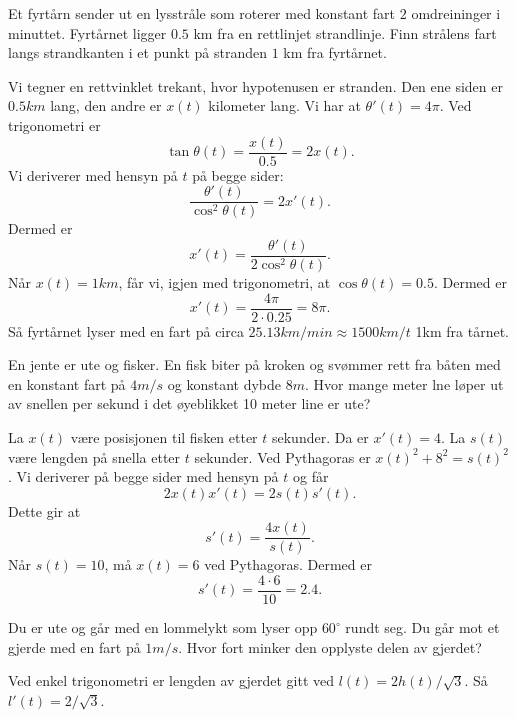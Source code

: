 \documentclass[11pt, norsk]{article}
\begin{document}
\begin{oppg}[7.2.3]
Et fyrtårn sender ut en lysstråle som roterer med konstant fart $2$ omdreininger i minuttet. Fyrtårnet ligger $0.5$ km fra en rettlinjet strandlinje. Finn strålens fart langs strandkanten i et punkt på stranden $1$ km fra fyrtårnet.
\end{oppg}

\begin{losn}
Vi tegner en rettvinklet trekant, hvor hypotenusen er stranden. Den ene siden er $0.5 km$ lang, den andre er $x(t)$ kilometer lang. Vi har at $\theta'(t)=4 \pi$. Ved trigonometri er
$$
\tan \theta(t) = \frac{x(t)}{0.5} = 2x(t).
$$
Vi deriverer med hensyn på $t$ på begge sider:
$$
\frac{\theta'(t)}{\cos^2 \theta(t)} = 2 x'(t).
$$
Dermed er 
$$
x'(t) = \frac{\theta'(t)}{2 \cos^2 \theta(t)}.
$$
Når $x(t)=1 km$, får vi, igjen med trigonometri, at $\cos \theta(t)=0.5$. Dermed er 
$$
x'(t) = \frac{4 \pi}{2 \cdot 0.25} = 8 \pi.
$$
Så fyrtårnet lyser med en fart på circa $25.13 km/min \approx 1500 km/t$ 1km fra tårnet.
\end{losn}

\begin{oppg}[7.2.5]
En jente er ute og fisker. En fisk biter på kroken og svømmer rett fra båten med en konstant fart på $4 m/s$ og konstant dybde $8 m$. Hvor mange meter lne løper ut av snellen per sekund i det øyeblikket 10 meter line er ute?
\end{oppg}

\begin{losn}
La $x(t)$ være posisjonen til fisken etter $t$ sekunder. Da er $x'(t)=4$. La $s(t)$ være lengden på snella etter $t$ sekunder. Ved Pythagoras er $x(t)^2 +8^2 = s(t)^2$. Vi deriverer på begge sider med hensyn på $t$ og får
$$
2x(t)x'(t) = 2s(t) s'(t).
$$
Dette gir at
$$
s'(t) = \frac{4x(t)}{s(t)}.
$$
Når $s(t)=10$, må $x(t)=6$ ved Pythagoras. Dermed er 
$$
s'(t) = \frac{4 \cdot 6}{10} = 2.4.
$$
\end{losn}

\begin{oppg}[7.2.7]
Du er ute og går med en lommelykt som lyser opp $60^\circ$ rundt seg. Du går mot et gjerde med en fart på $1 m/s$. Hvor fort minker den opplyste delen av gjerdet?
\end{oppg}

\begin{losn}
Ved enkel trigonometri er lengden av gjerdet gitt ved $l(t) = 2h(t)/\sqrt{3}$. Så $l'(t)= 2/\sqrt{3}$.
\end{losn}
\end{document}
